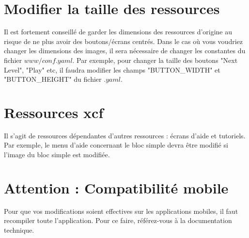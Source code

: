 \documentclass[11pt]{article}
\begin{document}
\section{Modifier la taille des ressources}
Il est fortement conseillé de garder les dimensions des ressources d'origine au risque de ne plus avoir des boutons/écrans centrés. Dans le cas où vous voudriez changer les dimensions des images, il sera nécessaire de changer les constantes du fichier $www/conf.yaml$. Par exemple, pour changer la taille des boutons "Next Level", "Play" etc, il faudra modifier les champs "BUTTON\_WIDTH" et "BUTTON\_HEIGHT" du fichier $.yaml$.

\section{Ressources xcf}
Il s'agit de ressources dépendantes d'autres ressources : écrans d'aide et tutoriels. Par exemple, le menu d'aide concernant le bloc simple devra être modifié si l'image du bloc simple est modifiée. 

\section{Attention : Compatibilité mobile}
Pour que vos modifications soient effectives sur les applications mobiles, il faut recompiler toute l'application. Pour ce faire, référez-vous à la documentation technique.
\end{document}
